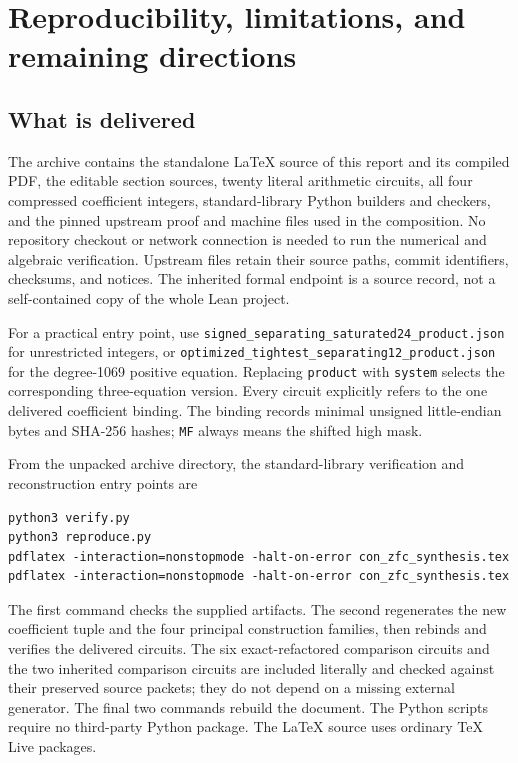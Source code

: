 \documentclass[11pt,letterpaper]{article}
\theoremstyle{remark}
\begin{document}

\section{Reproducibility, limitations, and remaining directions}
\label{sec:reproduction}

\subsection{What is delivered}

The archive contains the standalone \LaTeX{} source of this report and its
compiled PDF, the editable section sources, twenty literal arithmetic
circuits, all four compressed coefficient integers, standard-library
Python builders and checkers, and the pinned upstream proof and machine
files used in the composition.  No repository checkout or network
connection is needed to run the numerical and algebraic verification.
Upstream files retain their source paths, commit identifiers, checksums,
and notices.  The inherited formal endpoint is a source record, not a
self-contained copy of the whole Lean project.

For a practical entry point, use
\texttt{signed\_separating\_saturated24\_product.json} for unrestricted
integers, or
\texttt{optimized\_tightest\_separating12\_product.json} for the
degree-1069 positive equation.  Replacing \texttt{product} with
\texttt{system} selects the corresponding three-equation version.  Every
circuit explicitly refers to the one delivered coefficient binding.  The
binding records minimal unsigned little-endian bytes and SHA-256 hashes;
\texttt{MF} always means the shifted high mask.

From the unpacked archive directory, the standard-library verification
and reconstruction entry points are
\begin{verbatim}
python3 verify.py
python3 reproduce.py
pdflatex -interaction=nonstopmode -halt-on-error con_zfc_synthesis.tex
pdflatex -interaction=nonstopmode -halt-on-error con_zfc_synthesis.tex
\end{verbatim}
The first command checks the supplied artifacts.  The second regenerates
the new coefficient tuple and the four principal construction families,
then rebinds and verifies the delivered circuits.  The six exact-refactored
comparison circuits and the two inherited comparison circuits are included
literally and checked against their preserved source packets; they do not
depend on a missing external generator.  The final two commands rebuild
the document.  The Python scripts require no third-party Python package.
The \LaTeX{} source uses ordinary TeX Live packages.
\end{document}
